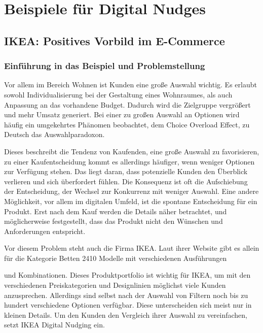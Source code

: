 \chapter{Beispiele für Digital Nudges}
\section{IKEA: Positives Vorbild im E-Commerce}
\subsection{Einführung in das Beispiel und Problemstellung}
Vor allem im Bereich Wohnen ist Kunden eine große Auswahl wichtig. Es erlaubt sowohl Individualisierung bei der Gestaltung eines Wohnraumes, als auch Anpassung an das vorhandene Budget. Dadurch wird die Zielgruppe vergrößert und mehr Umsatz generiert. Bei einer zu großen Auswahl an Optionen wird häufig ein umgekehrtes Phänomen beobachtet, dem Choice Overload Effect, zu Deutsch das Auswahlparadoxon. \parencite[S. 58]{Bauer.2018}

Dieses beschreibt die Tendenz von Kaufenden, eine große Auswahl zu favorisieren, zu einer Kaufentscheidung kommt es allerdings häufiger, wenn weniger Optionen zur Verfügung stehen. Das liegt daran, dass potenzielle Kunden den Überblick verlieren und sich überfordert fühlen. \parencite[S. 58]{Bauer.2018}Die Konsequenz ist oft die Aufschiebung der Entscheidung, der Wechsel zur Konkurrenz mit weniger Auswahl. Eine andere Möglichkeit, vor allem im digitalen Umfeld, ist die spontane Entscheidung für ein Produkt. Erst nach dem Kauf werden die Details näher betrachtet, und möglicherweise festgestellt, dass das Produkt nicht den Wünschen und Anforderungen entspricht.

Vor diesem Problem steht auch die Firma IKEA. Laut ihrer Website gibt es allein für die Kategorie Betten 2410 Modelle mit verschiedenen Ausführungen

und Kombinationen.\parencite{InterIKEASystemsB.V..2022} Dieses Produktportfolio ist wichtig für IKEA, um mit den verschiedenen Preiskategorien und Designlinien möglichst viele Kunden anzusprechen. Allerdings sind selbst nach der Auswahl von Filtern noch bis zu hundert verschiedene Optionen verfügbar. Diese unterscheiden sich meist nur in kleinen Details. Um den Kunden den Vergleich ihrer Auswahl zu vereinfachen, setzt IKEA Digital Nudging ein.
